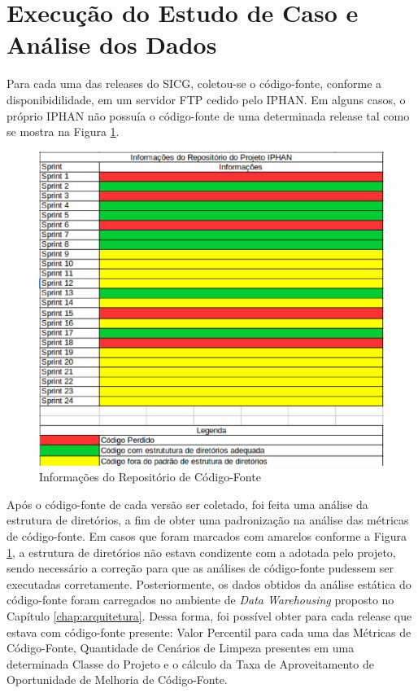 \section{Execução do Estudo de Caso e Análise dos Dados}
\label{sec:execution-case-study}

Para cada uma das releases do SICG, coletou-se o código-fonte, conforme a disponibidilidade, em um servidor FTP cedido pelo IPHAN. Em alguns casos, o próprio IPHAN não possuía o código-fonte de uma determinada release tal como se mostra na Figura \ref{fig:repositorio-IPHAN}.

\begin{figure}[ht!]
\centering
\includegraphics[keepaspectratio=true,scale=0.5]{figuras/repositorio-iphan.eps}
\caption{Informações do Repositório de Código-Fonte}
\label{fig:repositorio-IPHAN}
\end{figure}
\FloatBarrier


Após o código-fonte de cada versão ser coletado, foi feita uma análise da estrutura de diretórios, a fim de obter uma padronização na análise das métricas de código-fonte. Em casos que foram marcados com amarelos conforme a Figura \ref{fig:repositorio-IPHAN}, a estrutura de diretórios não estava condizente com a adotada pelo projeto, sendo necessário a correção para que as análises de código-fonte pudessem ser executadas corretamente. Posteriormente, os dados obtidos da análise estática do código-fonte foram carregados no ambiente de \textit{Data Warehousing} proposto no Capítulo \ref{chap:arquitetura}. Dessa forma, foi possível obter para cada release que estava com código-fonte presente: Valor Percentil para cada uma das Métricas de Código-Fonte, Quantidade de Cenários de Limpeza presentes em uma determinada Classe do Projeto e o cálculo da Taxa de Aproveitamento de Oportunidade de Melhoria de Código-Fonte. 


